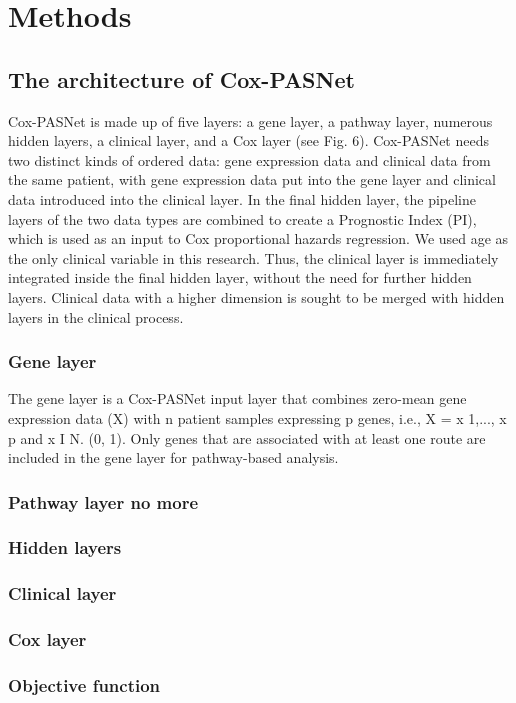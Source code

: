 \documentclass[10pt,twocolumn,twoside,lineno]{gsajnl}
\begin{document}
\section{Methods}
\subsection{The architecture of Cox-PASNet}
Cox-PASNet is made up of five layers: a gene layer, a pathway layer, numerous hidden layers, a clinical layer, and a Cox layer (see Fig. 6). Cox-PASNet needs two distinct kinds of ordered data: gene expression data and clinical data from the same patient, with gene expression data put into the gene layer and clinical data introduced into the clinical layer. In the final hidden layer, the pipeline layers of the two data types are combined to create a Prognostic Index (PI), which is used as an input to Cox proportional hazards regression. We used age as the only clinical variable in this research. Thus, the clinical layer is immediately integrated inside the final hidden layer, without the need for further hidden layers. Clinical data with a higher dimension is sought to be merged with hidden layers in the clinical process.
\subsubsection{Gene layer}
The gene layer is a Cox-PASNet input layer that combines zero-mean gene expression data (X) with n patient samples expressing p genes, i.e., X = x 1,..., x p and x I N. (0, 1). Only genes that are associated with at least one route are included in the gene layer for pathway-based analysis.

\subsubsection{Pathway layer no  more}
\subsubsection{Hidden layers}
\subsubsection{Clinical layer}
\subsubsection{Cox layer}
\subsubsection{Objective function}
\end{document}
